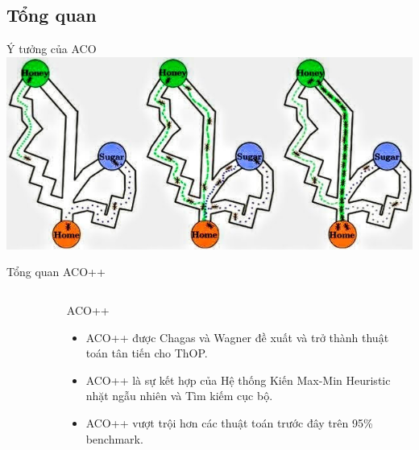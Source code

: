 \documentclass[aspectratio=169]{beamer}
\begin{document}
\subsection{Tổng quan}
\begin{frame}{Ý tưởng của ACO}
    \includegraphics[width=\columnwidth]{img/ACO concept.jpg}
\end{frame}
\begin{frame}{Tổng quan ACO++}
    \begin{columns}
        \begin{column}{0.35\textwidth}
            \vspace{-0.2cm}
            \begin{center}
                \begin{figure}[htbp]
                    \centering
                      \\
                \end{figure}
            \end{center}
        \end{column}
        \begin{column}{0.5\textwidth}
            \begin{block}{ACO++}
                \footnotesize
                \begin{itemize}
                    \justifying
                    \vspace{0.1cm}
                    \item ACO++ được Chagas và Wagner đề xuất và trở thành thuật toán tân tiến cho ThOP.
                    \vspace{0.1cm}
                    \item ACO++ là sự kết hợp của Hệ thống Kiến Max-Min Heuristic nhặt ngẫu nhiên và Tìm kiếm cục bộ.
                    \vspace{0.1cm}
                    \item ACO++ vượt trội hơn các thuật toán trước đây trên 95\% benchmark.
                    \vspace{0.1cm}
                \end{itemize}
            \end{block}
        \end{column}
    \end{columns}
\end{frame}
\end{document}
